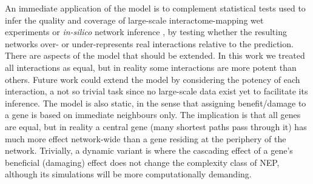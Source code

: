     An immediate application of the model is to complement statistical tests used to infer the quality and coverage of large-scale interactome-mapping wet experiments \cite{rolland_proteome-scale_2014} or \textit{in-silico} network inference \cite{mitra_integrative_2013}, by testing whether the resulting networks over- or under-represents real interactions relative to the prediction. There are aspects of the model that should be extended. In this work we treated all interactions as equal, but in reality some interactions are more potent than others. Future work could extend the model by considering the potency of each interaction, a not so trivial task since no large-scale data exist yet to facilitate its inference. The model is also static, in the sense that assigning benefit/damage to a gene is based on immediate neighbours only. The implication is that all genes are equal, but in reality a central gene (many shortest paths pass through it) has much more effect network-wide than a gene residing at the periphery of the network. Trivially, a dynamic variant is where the cascading effect of a gene's beneficial (damaging) effect does not change the complexity class of NEP, although its simulations will be more computationally demanding.


